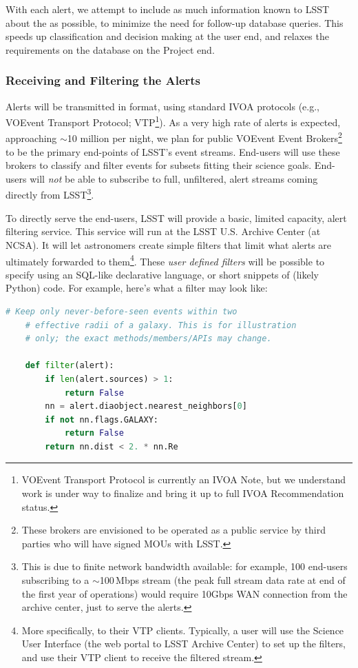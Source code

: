 \documentclass[SE,lsstdraft,toc]{lsstdoc}
\begin{document}
With each alert, we attempt to include as much information known to LSST about the \DIASource as possible, to minimize the need for follow-up database queries. This speeds up classification and decision making at the user end, and relaxes the requirements on the database on the Project end.

\subsubsection{Receiving and Filtering the Alerts}
\label{sec:eventbrokers}

Alerts will be transmitted in \VOEvent format, using standard IVOA protocols (e.g., VOEvent Transport Protocol; VTP\footnote{VOEvent Transport Protocol is currently an IVOA Note, but we understand work is under way to finalize and bring it up to full IVOA Recommendation status.}). As a very high rate of alerts is expected, approaching $\sim$10 million per night, we plan for public VOEvent Event Brokers\footnote{These brokers are envisioned to be operated as a public service by third parties who will have signed MOUs with LSST.} to be the primary end-points of LSST's event streams. End-users will use these brokers to classify and filter events for subsets fitting their science goals. End-users will \emph{not} be able to subscribe to full, unfiltered, alert streams coming directly from LSST\footnote{This is due to finite network bandwidth available: for example, 100 end-users subscribing to a $\sim$100\,Mbps stream (the peak full stream data rate at end of the first year of operations) would require 10Gbps WAN connection from the archive center, just to serve the alerts.}.

To directly serve the end-users, LSST will provide a basic, limited capacity, alert filtering service. This service will run at the LSST U.S. Archive Center (at NCSA). It will let astronomers create simple filters that limit what alerts are ultimately forwarded to them\footnote{More specifically, to their VTP clients. Typically, a user will use the Science User Interface (the web portal to LSST Archive Center) to set up the filters, and use their VTP client to receive the filtered \VOEvent stream.}. These \emph{user defined filters} will be possible to specify using an SQL-like declarative language, or short snippets of (likely Python) code. For example, here's what a filter may look like:

\begin{lstlisting}[language=python,commentstyle=\bfseries\color{green!40!black}]
    # Keep only never-before-seen events within two
    # effective radii of a galaxy. This is for illustration
    # only; the exact methods/members/APIs may change.

    def filter(alert):
        if len(alert.sources) > 1:
            return False
        nn = alert.diaobject.nearest_neighbors[0]
        if not nn.flags.GALAXY:
            return False
        return nn.dist < 2. * nn.Re
\end{lstlisting}
\end{document}
